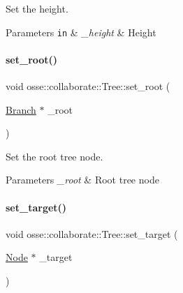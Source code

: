 Set the height. 


\begin{DoxyParams}[1]{Parameters}
\mbox{\tt in}  & {\em \+\_\+height} & Height \\
\hline
\end{DoxyParams}
\mbox{\label{classosse_1_1collaborate_1_1_tree_a7f289086d7ce1eb5bf8e500460ad3685}} 
\paragraph{\texorpdfstring{set\+\_\+root()}{set\_root()}}
{\footnotesize\ttfamily void osse\+::collaborate\+::\+Tree\+::set\+\_\+root (\begin{DoxyParamCaption}\item[{\hyperlink{structosse_1_1collaborate_1_1_tree_1_1_branch}{Branch} $\ast$}]{\+\_\+root }\end{DoxyParamCaption})\hspace{0.3cm}{\ttfamily [inline]}}



Set the root tree node. 


\begin{DoxyParams}{Parameters}
{\em \+\_\+root} & Root tree node \\
\hline
\end{DoxyParams}
\mbox{\label{classosse_1_1collaborate_1_1_tree_a6f95ca3aa1b76df2ddb562d11ea8d093}} 
\paragraph{\texorpdfstring{set\+\_\+target()}{set\_target()}}
{\footnotesize\ttfamily void osse\+::collaborate\+::\+Tree\+::set\+\_\+target (\begin{DoxyParamCaption}\item[{\hyperlink{classosse_1_1collaborate_1_1_node}{Node} $\ast$}]{\+\_\+target }\end{DoxyParamCaption})\hspace{0.3cm}{\ttfamily [inline]}}



